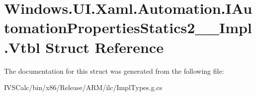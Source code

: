 \hypertarget{struct_windows_1_1_u_i_1_1_xaml_1_1_automation_1_1_i_automation_properties_statics2_____impl_1_1_vtbl}{}\section{Windows.\+U\+I.\+Xaml.\+Automation.\+I\+Automation\+Properties\+Statics2\+\_\+\+\_\+\+Impl.\+Vtbl Struct Reference}
\label{struct_windows_1_1_u_i_1_1_xaml_1_1_automation_1_1_i_automation_properties_statics2_____impl_1_1_vtbl}


The documentation for this struct was generated from the following file\+:\begin{DoxyCompactItemize}
\item 
I\+V\+S\+Calc/bin/x86/\+Release/\+A\+R\+M/ilc/Impl\+Types.\+g.\+cs\end{DoxyCompactItemize}
